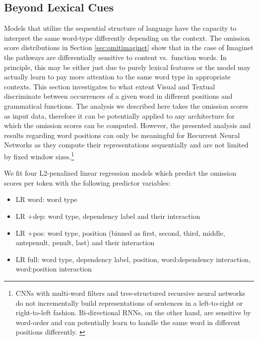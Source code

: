 

\subsection{Beyond Lexical Cues}
\label{sec:beyondlexical}

Models that utilize the sequential structure of language 
have the capacity to interpret the same word-type differently depending on
the context. The omission score distributions in Section \ref{sec:omitimaginet} 
show that in the case of {\sc Imaginet} the 
pathways are differentially sensitive to content vs.\ function
words. In principle, this may be either just due to purely lexical features or the model 
may actually learn to pay more attention to the same word type in appropriate
contexts. This section investigates to what extent {\sc Visual} and {\sc Textual}
discriminate between occurrences of a given word in different positions and 
grammatical functions. The analysis we described here takes \label{edit:beyonlexicalgeneral}
the omission scores as input data, therefore it can be potentially applied 
to any architecture for which the omission scores can be computed. However,
the presented analysis and results regarding word positions can only be meaningful
for Recurrent Neural Networks as they compute their representations sequentially and are not
limited by fixed window sizes.\footnote{CNNs with multi-word filters
and tree-structured recursive neural networks do not incrementally build representations
of sentences in a left-to-right or right-to-left fashion. 
Bi-directional RNNs, on the other hand, are sensitive by word-order and can potentially
learn to handle the same word in different positions differently. \label{edit:foot}}

We fit four L2-penalized linear regression models which predict the omission 
scores per token with the following predictor variables: 
\begin{itemize}
	\item {\sc LR word}: word type
	\item {\sc LR +dep}: word type, dependency label and their interaction 
	\item {\sc LR +pos}: word type, position (binned as {\sc first, second, third, middle,
	antepenult, penult, last}) and their interaction
	\item {\sc LR full}: word type, dependency label, position, word:dependency interaction, 
	word:position interaction
\end{itemize}

